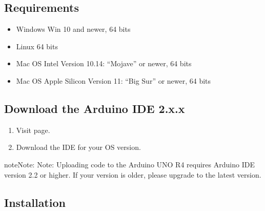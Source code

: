 \documentclass[a4paper,11pt,english]{sphinxmanual}
\begin{document}
\subsection{Requirements}
\label{\detokenize{Get_Started_with_Arduino/Install_Arduino_IDE:requirements}}\begin{itemize}
\item {} 
\sphinxAtStartPar
Windows \sphinxhyphen{} Win 10 and newer, 64 bits

\item {} 
\sphinxAtStartPar
Linux \sphinxhyphen{} 64 bits

\item {} 
\sphinxAtStartPar
Mac OS Intel \sphinxhyphen{} Version 10.14: “Mojave” or newer, 64 bits

\item {} 
\sphinxAtStartPar
Mac OS Apple Silicon \sphinxhyphen{} Version 11: “Big Sur” or newer, 64 bits

\end{itemize}


\subsection{Download the Arduino IDE 2.x.x}
\label{\detokenize{Get_Started_with_Arduino/Install_Arduino_IDE:download-the-arduino-ide-2-x-x}}\begin{enumerate}
%
\item {} 
\sphinxAtStartPar
Visit  page.

\item {} 
\sphinxAtStartPar
Download the IDE for your OS version.

\noindent{}

\end{enumerate}

\begin{sphinxadmonition}{note}{Note:}
\sphinxAtStartPar
Note: Uploading code to the Arduino UNO R4 requires Arduino IDE version 2.2 or higher. If your version is older, please upgrade to the latest version.
\end{sphinxadmonition}


\subsection{Installation}
\label{\detokenize{Get_Started_with_Arduino/Install_Arduino_IDE:installation}}
\end{document}
